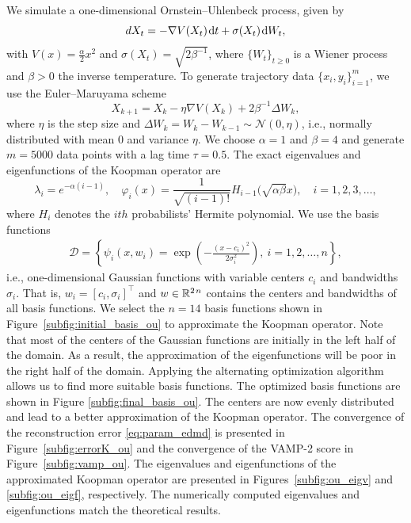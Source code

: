 \documentclass
[
    a4paper,
    DIV=11,
    abstract=true,
    11pt,
]
{scrartcl}
\newcommand{\R}{\mathbb{R}}                                      %
\newcommand{\ts}{\hspace*{0.1em}}                                %
\theoremstyle{definition}
\begin{document}
We simulate a one-dimensional Ornstein--Uhlenbeck process, given by
\begin{equation} \label{eq:SDE}
    dX_t = -\nabla V(X_t) \ts \mathrm{d}t + \sigma(X_t) \ts \mathrm{d}W_t,
\end{equation}
with $V(x) = \frac{\alpha}{2}x^2$ and $\sigma(X_t) = \sqrt{2 \beta^{-1}}$, where $\{W_t\}_{t \geq 0}$ is a Wiener process and $\beta>0$ the inverse temperature. To generate trajectory data $\{x_i, y_i\}_{i=1}^m$, we use the Euler--Maruyama scheme
\begin{equation*}
    X_{k+1} = X_k - \eta \nabla V(X_k) + 2 \beta^{-1} \Delta W_k,
\end{equation*}
where $\eta$ is the step size and $\Delta W_k = W_k - W_{k-1} \sim \mathcal{N}(0, \eta)$, i.e., normally distributed with mean $0$ and variance $\eta$. We choose $\alpha = 1$ and $ \beta = 4$ and generate $m = 5000$ data points with a lag time $\tau = 0.5$. The exact eigenvalues and eigenfunctions of the Koopman operator are
\begin{equation*}
    \lambda_i = e^{-\alpha(i-1)}, \quad \varphi_i(x) = \frac{1}{\sqrt{(i-1)!}}H_{i-1}\big(\sqrt{\alpha \beta} x \big), \quad i = 1,2,3,\dots,
\end{equation*}
where $H_i$ denotes the $ith$ probabilists' Hermite polynomial. We use the basis functions
\begin{align*}
    \mathcal{D} = \left\{ \psi_i(x, w_i) =  \exp\left(-\tfrac{(x - c_{i})^2}{2\sigma_{i}^2}\right), ~ i = 1, 2, \dots, n \right\},
\end{align*}
i.e., one-dimensional Gaussian functions with variable centers $ c_i $ and bandwidths $ \sigma_i $. That is, $ w_i = [c_i, \sigma_i]^\top $ and $ w \in \R^{2 \ts n} $ contains the centers and bandwidths of all basis functions. We select the $n=14$ basis functions shown in Figure~\ref{subfig:initial_basis_ou} to approximate the Koopman operator. Note that most of the centers of the Gaussian functions are initially in the left half of the domain. As a result, the approximation of the eigenfunctions will be poor in the right half of the domain. Applying the alternating optimization algorithm allows us to find more suitable basis functions. The optimized basis functions are shown in Figure \ref{subfig:final_basis_ou}. The centers are now evenly distributed and lead to a better approximation of the Koopman operator. The convergence of the reconstruction error \eqref{eq:param_edmd} is presented in Figure~\ref{subfig:errorK_ou} and the convergence of the VAMP-2 score in Figure~\ref{subfig:vamp_ou}. The eigenvalues and eigenfunctions of the approximated Koopman operator are presented in Figures~\ref{subfig:ou_eigv} and \ref{subfig:ou_eigf}, respectively. The numerically computed eigenvalues and eigenfunctions match the theoretical results.
\end{document}
